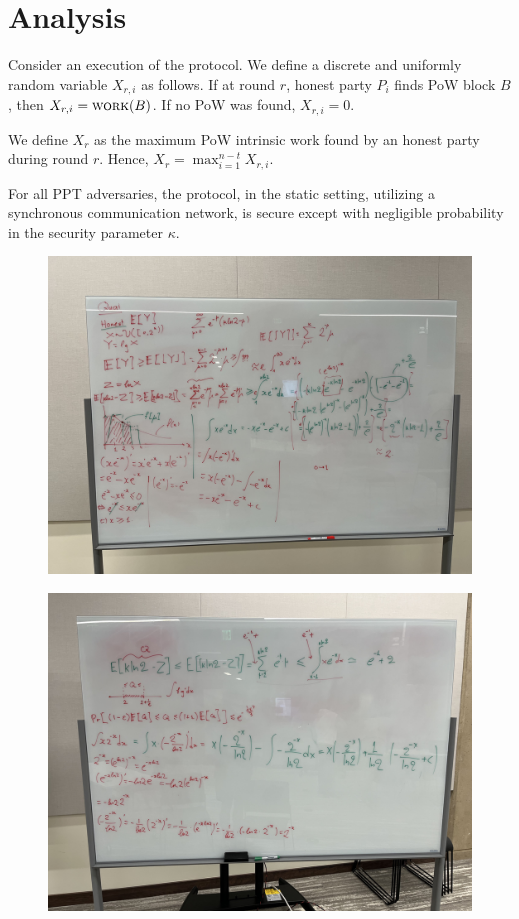 \section{Analysis}

Consider an execution of the \poem protocol.
We define a discrete and uniformly random variable $X_{r, i}$ as follows.
If at round $r$, honest party $P_i$ finds PoW block $B$, then $X_{r, i} = \textsc{work}(B)$.
If no PoW was found, $X_{r, i} = 0$.

We define $X_{r}$ as the maximum PoW intrinsic work found by an honest party during
round $r$. Hence, $X_{r} = \max_{i = 1}^{n - t}{X_{r,i}}$.

\begin{conjecture}
  For all PPT adversaries, the \poem protocol, in
  the static setting, utilizing a synchronous communication network, is
  secure except with negligible probability in the security parameter $\kappa$.
\end{conjecture}

\begin{figure}[h]
    \centering
    \includegraphics[width=1\textwidth]{figures/bounds-1.jpeg}
\end{figure}

\begin{figure}[h]
    \centering
    \includegraphics[width=1\textwidth]{figures/bounds-2.jpeg}
\end{figure}
